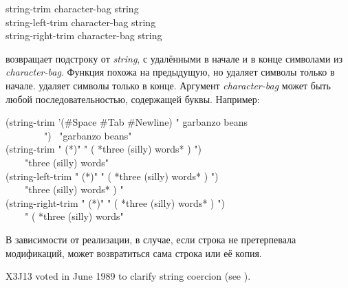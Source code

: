 \begin{defun}[Функция]
string-trim character-bag string \\
string-left-trim character-bag string \\
string-right-trim character-bag string

 возвращает подстроку от \emph{string}, с удалёнными в начале и
в конце символами из \emph{character-bag}.
Функция  похожа на предыдущую, но удаляет символы только в
начале.
 удаляет символы только в
конце.
Аргумент \emph{character-bag} может быть любой последовательностью, содержащей
буквы.
Например:
\begin{lisp}
(string-trim '(\#{\Xbackslash}Space \#{\Xbackslash}Tab \#{\Xbackslash}Newline) " garbanzo beans \\
~~~~~~~~") \EV\ "garbanzo beans" \\
(string-trim " (*)" " ( *three (silly) words* ) ") \\
~~~\EV\ "three (silly) words" \\
(string-left-trim " (*)" " ( *three (silly) words* ) ") \\
~~~\EV\ "three (silly) words* ) " \\
(string-right-trim " (*)" " ( *three (silly) words* ) ") \\
~~~\EV\ " ( *three (silly) words"
\end{lisp}
В зависимости от реализации, в случае, если строка не претерпевала модификаций,
может возвратиться сама строка или её копия.

\begin{newer}
X3J13 voted in June 1989 
to clarify string coercion (see ).
\end{newer}
\end{defun}


